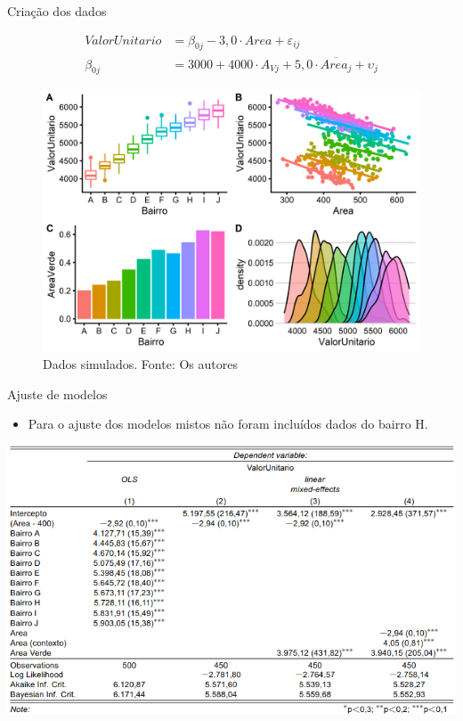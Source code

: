 \documentclass[9pt,ignorenonframetext,aspectratio=169]{beamer}
\providecommand{\tightlist}{%
  \setlength{\itemsep}{0pt}\setlength{\parskip}{0pt}}
\begin{document}
\begin{frame}{Criação dos dados}
\protect\hypertarget{criauxe7uxe3o-dos-dados}{}

\begin{align}
ValorUnitario &= \beta_{0j} - 3,0 \cdot Area + \varepsilon_{ij}  \label{eq:EC1}\\
\beta_{0j} &= 3000 + 4000 \cdot A_{Vj} + 5,0 \cdot \overline{Area_j} + \upsilon_j \label{eq:EC2}
\end{align}

\begin{figure}

{\centering \includegraphics[width=0.5\linewidth]{../../images/exploratoria-1} 

}

\caption{Dados simulados. Fonte: Os autores}\label{fig:unnamed-chunk-4}
\end{figure}

\end{frame}

\begin{frame}{Ajuste de modelos}
\protect\hypertarget{ajuste-de-modelos}{}

\begin{itemize}[<+->]
\tightlist
\item
  Para o ajuste dos modelos mistos não foram incluídos dados do bairro
  H.
\end{itemize}

\begin{center}\includegraphics[width=0.8\linewidth]{../../images/tabela} \end{center}

\end{frame}
\end{document}
